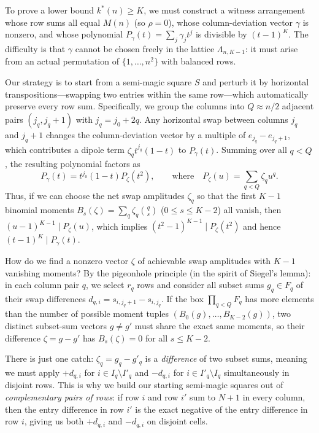 To prove a lower bound $k^*(n)\ge K$, we must construct a witness arrangement whose row sums all equal $M(n)$ (so $\rho=0$), whose column-deviation vector $\gamma$ is nonzero, and whose polynomial $P_\gamma(t)=\sum_j\gamma_jt^j$ is divisible by $(t-1)^K$. The difficulty is that $\gamma$ cannot be chosen freely in the lattice $\Lambda_{n,K-1}$: it must arise from an actual permutation of $\{1,\dots,n^2\}$ with balanced rows.

Our strategy is to start from a semi-magic square $S$ and perturb it by horizontal transpositions—swapping two entries within the same row—which automatically preserve every row sum. Specifically, we group the columns into $Q\approx n/2$ adjacent pairs $(j_q, j_q+1)$ with $j_q=j_0+2q$. Any horizontal swap between columns $j_q$ and $j_q+1$ changes the column-deviation vector by a multiple of $e_{j_q}-e_{j_q+1}$, which contributes a dipole term $\zeta_q t^{j_q}(1-t)$ to $P_\gamma(t)$. Summing over all $q<Q$, the resulting polynomial factors as
\[
P_\gamma(t)=t^{j_0}(1-t)P_\zeta(t^2),\qquad\text{where}\quad P_\zeta(u)=\sum_{q<Q}\zeta_q u^q.
\]
Thus, if we can choose the net swap amplitudes $\zeta_q$ so that the first $K-1$ binomial moments $B_s(\zeta)=\sum_q\zeta_q\binom qs$ ($0\le s\le K-2$) all vanish, then $(u-1)^{K-1}\mid P_\zeta(u)$, which implies $(t^2-1)^{K-1}\mid P_\zeta(t^2)$ and hence $(t-1)^K\mid P_\gamma(t)$.

How do we find a nonzero vector $\zeta$ of achievable swap amplitudes with $K-1$ vanishing moments? By the pigeonhole principle (in the spirit of Siegel's lemma): in each column pair $q$, we select $r_q$ rows and consider all subset sums $g_q \in F_q$ of their swap differences $d_{q,i}=s_{i,j_q+1}-s_{i,j_q}$. If the box $\prod_{q<Q} F_q$ has more elements than the number of possible moment tuples $(B_0(g),\dots,B_{K-2}(g))$, two distinct subset-sum vectors $g\ne g'$ must share the exact same moments, so their difference $\zeta = g - g'$ has $B_s(\zeta)=0$ for all $s\le K-2$.

There is just one catch: $\zeta_q = g_q - g'_q$ is a \emph{difference} of two subset sums, meaning we must apply $+d_{q,i}$ for $i\in I_q\setminus I'_q$ and $-d_{q,i}$ for $i\in I'_q\setminus I_q$ simultaneously in disjoint rows. This is why we build our starting semi-magic squares out of \emph{complementary pairs of rows}: if row $i$ and row $i'$ sum to $N+1$ in every column, then the entry difference in row $i'$ is the exact negative of the entry difference in row $i$, giving us both $+d_{q,i}$ and $-d_{q,i}$ on disjoint cells.


